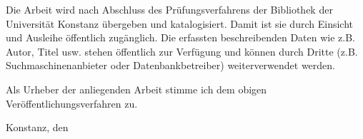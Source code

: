 \documentclass[
	oneside,
	parskip=half,
	a4paper,
]{scrbook}
\begin{document}
Die Arbeit wird nach Abschluss des Prüfungsverfahrens der Bibliothek der Universität Konstanz
übergeben und katalogisiert. Damit ist sie durch Einsicht und Ausleihe öffentlich zugänglich. Die
erfassten beschreibenden Daten wie z.B. Autor, Titel usw. stehen öffentlich zur Verfügung und können
durch Dritte (z.B. Suchmaschinenanbieter oder Datenbankbetreiber) weiterverwendet werden.

Als Urheber der anliegenden Arbeit stimme ich dem obigen Veröffentlichungsverfahren zu.

Konstanz, den 
\end{document}
